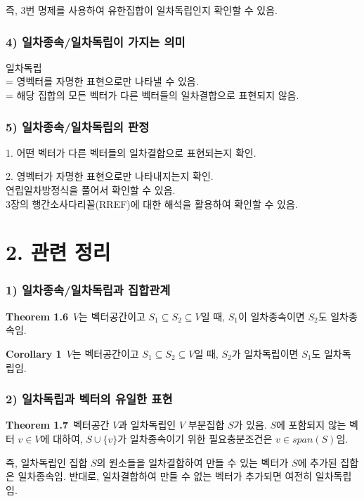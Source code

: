 즉, 3번 명제를 사용하여 유한집합이 일차독립인지 확인할 수 있음.


\subsubsection*{4) 일차종속/일차독립이 가지는 의미}
일차독립\\
= 영벡터를 자명한 표현으로만 나타낼 수 있음.\\ 
= 해당 집합의 모든 벡터가 다른 벡터들의 일차결합으로 표현되지 않음.


\subsubsection*{5) 일차종속/일차독립의 판정}
1. 어떤 벡터가 다른 벡터들의 일차결합으로 표현되는지 확인.

2. 영벡터가 자명한 표현으로만 나타내지는지 확인.\\
연립일차방정식을 풀어서 확인할 수 있음.\\
3장의 행간소사다리꼴(RREF)에 대한 해석을 활용하여 확인할 수 있음.


\newpage


\section*{2. 관련 정리}
\subsubsection*{1) 일차종속/일차독립과 집합관계}

\textbf{Theorem 1.6}\, $V$는 벡터공간이고 $S_1 \subseteq S_2 \subseteq V$일 때, $S_1$이 일차종속이면 $S_2$도 일차종속임.

\textbf{Corollary 1}\, $V$는 벡터공간이고 $S_1 \subseteq S_2 \subseteq V$일 때, $S_2$가 일차독립이면 $S_1$도 일차독립임.

\subsubsection*{2) 일차독립과 벡터의 유일한 표현}

\textbf{Theorem 1.7}\, 벡터공간 $V$과 일차독립인 $V$ 부분집합 $S$가 있음. $S$에 포함되지 않는 벡터 $v \in V$에 대하여, $S \cup \{v\}$가 일차종속이기 위한 필요충분조건은 $v \in span(S)$임.

즉, 일차독립인 집합 $S$의 원소들을 일차결합하여 만들 수 있는 벡터가 $S$에 추가된 집합은 일차종속임. 반대로, 일차결합하여 만들 수 없는 벡터가 추가되면 여전히 일차독립임.

